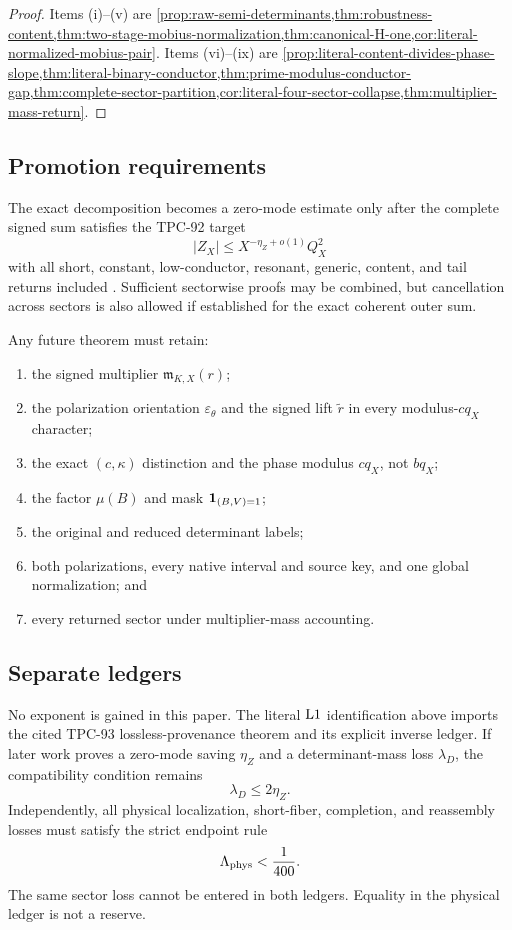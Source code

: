 \begin{proof}
Items (i)--(v) are
\cref{prop:raw-semi-determinants,thm:robustness-content,thm:two-stage-mobius-normalization,thm:canonical-H-one,cor:literal-normalized-mobius-pair}.
Items (vi)--(ix) are
\cref{prop:literal-content-divides-phase-slope,thm:literal-binary-conductor,thm:prime-modulus-conductor-gap,thm:complete-sector-partition,cor:literal-four-sector-collapse,thm:multiplier-mass-return}.
\end{proof}

\subsection{Promotion requirements}

The exact decomposition becomes a zero-mode estimate only after the
complete signed sum satisfies the TPC-92 target
\[
 |Z_X|
 \le X^{-\eta_Z+o(1)}Q_X^2
\]
with all short, constant, low-conductor, resonant, generic, content,
and tail returns included \citep{WangTPC92}.  Sufficient sectorwise
proofs may be combined, but cancellation across sectors is also
allowed if established for the exact coherent outer sum.

Any future theorem must retain:
\begin{enumerate}[label=(\arabic*),leftmargin=2.2em]
\item the signed multiplier \(\mathfrak m_{K,X}(r)\);
\item the polarization orientation \(\varepsilon_\theta\) and the
  signed lift \(\widetilde r\) in every modulus-\(cq_X\) character;
\item the exact \((c,\kappa)\) distinction and the phase modulus
  \(cq_X\), not \(bq_X\);
\item the factor \(\mu(B)\) and mask
  \(\mathbf 1_{(B,V)=1}\);
\item the original and reduced determinant labels;
\item both polarizations, every native interval and source key, and
  one global normalization; and
\item every returned sector under multiplier-mass accounting.
\end{enumerate}

\subsection{Separate ledgers}

No exponent is gained in this paper.  The literal \(\mathrm{L1}\)
identification above imports the cited TPC-93
lossless-provenance theorem and its explicit inverse ledger.  If later work proves a
zero-mode saving \(\eta_Z\) and a determinant-mass loss
\(\lambda_D\), the compatibility condition remains
\[
 \lambda_D\le2\eta_Z.
\]
Independently, all physical localization, short-fiber, completion,
and reassembly losses must satisfy the strict endpoint rule
\[
 \Lambda_{\rm phys}<\frac1{400}.
\]
The same sector loss cannot be entered in both ledgers.  Equality in
the physical ledger is not a reserve.

